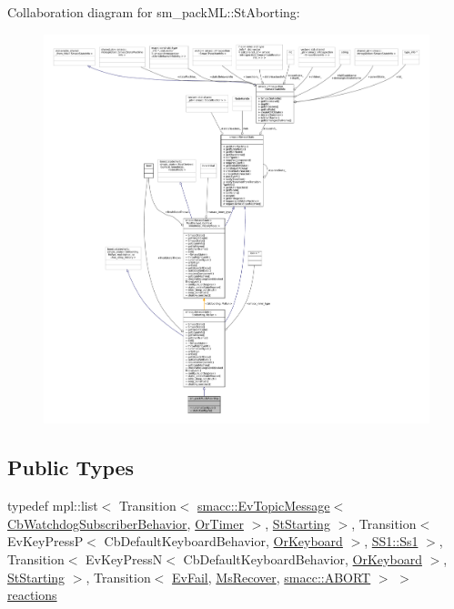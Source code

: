 Collaboration diagram for sm\+\_\+pack\+ML\+:\+:St\+Aborting\+:
\nopagebreak
\begin{figure}[H]
\begin{center}
\leavevmode
\includegraphics[width=350pt]{structsm__packML_1_1StAborting__coll__graph}
\end{center}
\end{figure}
\subsection*{Public Types}
\begin{DoxyCompactItemize}
\item 
typedef mpl\+::list$<$ Transition$<$ \hyperlink{structsmacc_1_1default__events_1_1EvTopicMessage}{smacc\+::\+Ev\+Topic\+Message}$<$ \hyperlink{classsm__packML_1_1cl__subscriber_1_1CbWatchdogSubscriberBehavior}{Cb\+Watchdog\+Subscriber\+Behavior}, \hyperlink{classsm__packML_1_1OrTimer}{Or\+Timer} $>$, \hyperlink{structsm__packML_1_1StStarting}{St\+Starting} $>$, Transition$<$ Ev\+Key\+PressP$<$ Cb\+Default\+Keyboard\+Behavior, \hyperlink{classsm__packML_1_1OrKeyboard}{Or\+Keyboard} $>$, \hyperlink{structsm__packML_1_1SS1_1_1Ss1}{S\+S1\+::\+Ss1} $>$, Transition$<$ Ev\+Key\+PressN$<$ Cb\+Default\+Keyboard\+Behavior, \hyperlink{classsm__packML_1_1OrKeyboard}{Or\+Keyboard} $>$, \hyperlink{structsm__packML_1_1StStarting}{St\+Starting} $>$, Transition$<$ \hyperlink{structsm__packML_1_1EvFail}{Ev\+Fail}, \hyperlink{classsm__packML_1_1MsRecover}{Ms\+Recover}, \hyperlink{structsmacc_1_1default__transition__tags_1_1ABORT}{smacc\+::\+A\+B\+O\+RT} $>$ $>$ \hyperlink{structsm__packML_1_1StAborting_a1744e2a5b809814643a4e0f6c0ebdfcf}{reactions}
\end{DoxyCompactItemize}
